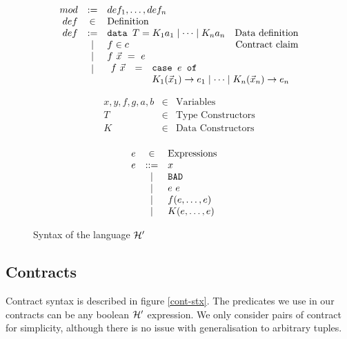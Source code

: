 \documentclass[preprint]{sigplanconf}
\begin{document}
\begin{figure}[h]
  \centering
  \[
  \begin{array}{rclr}
    mod &:=& def_1,\dots,def_n &\\
    def &\in& \mbox{Definition} & \\
    def &:=& \texttt{data } T = K_1 a_1 \mid \cdots \mid K_n a_n& \mbox{Data definition}\\
    &\mid& f \in c & \mbox{Contract claim}\\
    &\mid& f~\vec{x}~=~e & \\
    &\raisebox{ 0.18 cm }{$\mid$}& \multicolumn{2}{c}{
      \begin{array}{rcl}
        \hspace{-0.2cm} f~\vec{x} &=& \texttt{case } e \texttt{ of } \\
         && K_1(\vec{x}_1) \to e_1 \mid \cdots \mid K_n(\vec{x}_n) \to e_n \\
       \end{array} 
       } \\
  \end{array} \]
  
  \[  \begin{array}{rclr}
    x,y,f,g,a,b & \in & \mbox{Variables} \\
    T &\in& \mbox{Type Constructors} \\
    K &\in& \mbox{Data Constructors} \\
  \end{array} \]

  \[  \begin{array}{rclr}
    e &\in& \mbox{Expressions} & \\
    e &::=& x & \\
    &\mid& \texttt{BAD} & \\
    &\mid& e~e & \\
    &\mid& f(e,\dots,e) & \\
    &\mid& K(e,\dots,e) & \\
  \end{array} \]

\caption{Syntax of the language $\mathcal{H}'$}
\label{hprime-stx}
\end{figure}



\subsection{Contracts}
Contract syntax is described in figure \ref{cont-stx}. The predicates
we use in our contracts can be any boolean $\mathcal{H}'$ expression. We
only consider pairs of contract for simplicity, although there is no
issue with generalisation to arbitrary tuples.
\end{document}
